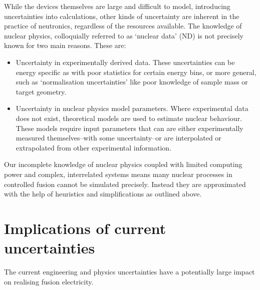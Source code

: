 While the devices themselves are large and difficult to model, introducing uncertainties into calculations, other kinds of uncertainty are inherent in the practice of neutronics, regardless of the resources available. The knowledge of nuclear physics, colloquially referred to as `nuclear data' (ND)  is not precisely known for two main reasons. These are:  

\begin{itemize}
  \item Uncertainty in experimentally derived data. These uncertainties can be energy specific as with poor statistics for certain energy bins, or more general, such as `normalisation uncertainties' like poor knowledge of sample mass or target geometry.
  \item Uncertainty in nuclear physics model parameters. Where experimental data does not exist, theoretical models are used to estimate nuclear behaviour. These models require input parameters that can are either experimentally measured themselves--with some uncertainty--or are interpolated or extrapolated from other experimental information. 
\end{itemize}

Our incomplete knowledge of nuclear physics coupled with limited computing power and complex, interrelated systems means many nuclear processes in controlled fusion cannot be simulated precisely. Instead they are approximated with the help of heuristics and simplifications as outlined above. 

\section{Implications of current uncertainties}
The current engineering and physics uncertainties have a potentially large impact on realising fusion electricity. 


